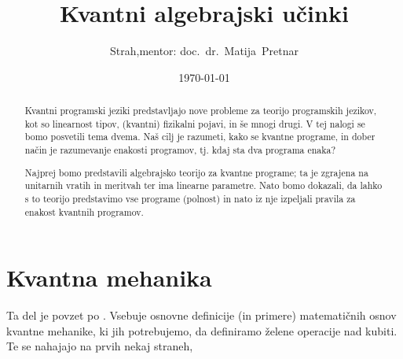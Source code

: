 \documentclass[a4paper,slovene]{article}
\title{Kvantni algebrajski učinki}
\author{Strah,\quad mentor: doc.~dr.~Matija~Pretnar}
\date{\today}
\begin{document}
\maketitle

\begin{abstract}

    Kvantni programski jeziki predstavljajo nove probleme za teorijo programskih jezikov,
    kot so linearnost tipov, (kvantni) fizikalni pojavi, in še mnogi drugi.
    V tej nalogi se bomo posvetili tema dvema.
    Naš cilj je razumeti, kako se kvantne programe,
    in dober način je razumevanje enakosti programov,
    tj. kdaj sta dva programa enaka?


    Najprej bomo predstavili algebrajsko teorijo za kvantne programe;
    ta je zgrajena na unitarnih vratih in meritvah ter ima linearne parametre.
    Nato bomo dokazali, da lahko s to teorijo predstavimo vse programe (polnost)
    in nato iz nje izpeljali pravila za enakost kvantnih programov.

\end{abstract}

\section{Kvantna mehanika}
Ta del je povzet po \cite{ess-qc}.
Vsebuje osnovne definicije (in primere) matematičnih osnov kvantne mehanike,
ki jih potrebujemo, da definiramo želene operacije nad kubiti.
Te se nahajajo na prvih nekaj straneh, 
\end{document}
